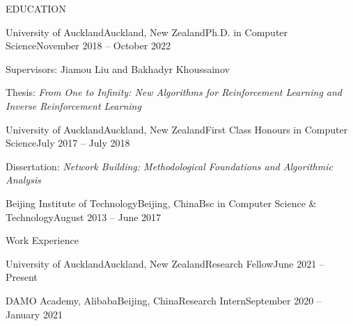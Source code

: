 \documentclass{resume} %
\begin{document}

\begin{rSection}{EDUCATION}

\begin{rSubsection}{University of Auckland}{Auckland, New Zealand}{Ph.D. in Computer Science}{November 2018 -- October 2022}%
\item Supervisors: Jiamou Liu and Bakhadyr Khoussainov
\item Thesis: {\em From One to Infinity: New Algorithms for Reinforcement Learning and Inverse Reinforcement Learning}
\end{rSubsection}

\begin{rSubsection}{University of Auckland}{Auckland, New Zealand}{First Class Honours in Computer Science}{July 2017 -- July 2018}
\item Dissertation: {\em Network Building: Methodological Foundations and Algorithmic Analysis}
\end{rSubsection}

\begin{rSubsection}{Beijing Institute of Technology}{Beijing, China}{Bsc in Computer Science \& Technology}{August 2013 -- June 2017}
\end{rSubsection}
\end{rSection}


\begin{rSection}{Work Experience}
\begin{rSubsection}{University of Auckland}{Auckland, New Zealand}{Research Fellow}{June 2021 -- Present}
\end{rSubsection}
	\begin{rSubsection}{DAMO Academy, Alibaba}{Beijing, China}{Research Intern}{September 2020 -- January 2021}
\end{rSubsection}
\end{rSection}
\end{document}
